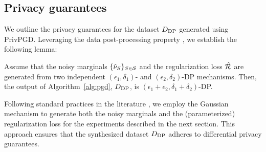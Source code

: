 \subsection{Privacy guarantees}
We outline the privacy guarantees for the dataset $D_{\text{DP}}$ generated using PrivPGD. Leveraging the data post-processing property \citep{gauss_mechanism}, we establish the following lemma:
\begin{lemma}
    Assume that the noisy marginals $ \{\hat \nu_{S}\}_{ S \in \mathcal S}$  and the regularization loss $\hat {\mathcal R}$ are generated from two independent $(\epsilon_1, \delta_1)$- and $(\epsilon_2, \delta_2)$-DP mechanisms. Then, the output of Algorithm~\ref{alg:pgd},   $D_{\text{DP}}$, is $(\epsilon_1 + \epsilon_2, \delta_1+ \delta_2)$-DP.
\end{lemma}
Following standard practices in the literature \citep{mst, aim, vietri2022private}, we employ the Gaussian mechanism to generate both the noisy marginals and the (parameterized) regularization loss for the experiments described in the next section. This approach ensures that the synthesized dataset $D_{\text{DP}}$ adheres to differential privacy guarantees.


